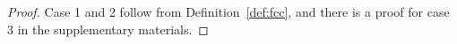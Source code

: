 \documentclass[aoas]{imsart}
\begin{document}
\begin{proof}
  Case 1 and 2 follow from Definition~\ref{def:fcc}, and there is a
  proof for case 3 in the supplementary materials.



\end{proof}
\end{document}
